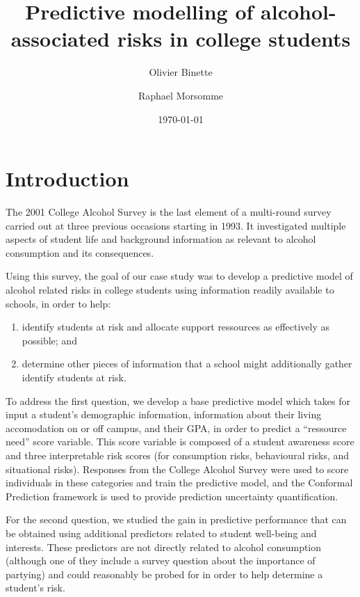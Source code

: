 \documentclass[10pt]{amsart}%
\title{Predictive modelling of alcohol-associated risks in college students}
\author{Olivier Binette \and Raphael Morsomme}
\date{\today} %
\begin{document}
\maketitle

\section{Introduction}
\label{sec:intro}

The 2001 College Alcohol Survey is the last element of a multi-round survey carried out at three previous occasions starting in 1993. It investigated multiple aspects of student life and background information as relevant to alcohol consumption and its consequences. 

Using this survey, the goal of our case study was to develop a predictive model of alcohol related risks in college students using information readily available to schools, in order to help:
\begin{enumerate}
  \item identify students at risk and allocate support ressources as effectively as possible; and
  \item determine other pieces of information that a school might additionally gather identify students at risk.
\end{enumerate}
To address the first question, we develop a base predictive model which takes for input a student's demographic information, information about their living accomodation on or off campus, and their GPA, in order to predict a ``ressource need'' score variable. This score variable is composed of a student awareness score and three interpretable risk scores (for consumption risks, behavioural risks, and situational risks). Responses from the College Alcohol Survey were used to score individuals in these categories and train the predictive model, and the Conformal Prediction framework is used to provide prediction uncertainty quantification.

For the second question, we studied the gain in predictive performance that can be obtained using additional predictors related to student well-being and interests. These predictors are not directly related to alcohol consumption (although one of they include a survey question about the importance of partying) and could reasonably be probed for in order to help determine a student's risk. 
\end{document}
